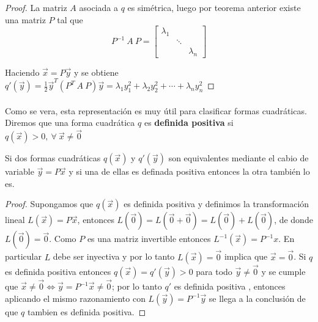 \begin{proof}
La matriz $A$ asociada a $q$ es simétrica, luego por teorema anterior existe una matriz $P$ tal que 
\begin{equation*}
    P^{-1}~A~P = \begin{bmatrix}
    \lambda_{1} & &\\
    & \ddots & \\
    & & \lambda_{n}
    \end{bmatrix}
    \label{ecuacion:1.4}
\end{equation*}

Haciendo $\overrightarrow{x} = P\overrightarrow{y}$ y se obtiene $q'(\overrightarrow{y}) = \frac{1}{2}\overrightarrow{y}^{T}\left(P^{T}~A~P\right)\overrightarrow{y} = \lambda_{1}y_{1}^{2} + \lambda_{2}y_{2}^{2} + \cdots + \lambda_{n}y_{n}^{2}$

\end{proof}

\paragraph*{}
Como se vera, esta representación es muy útil para clasificar formas cuadráticas. Diremos que una forma cuadrática $q$ es \textbf{definida positiva} si $q(\overrightarrow{x}) > 0, ~\forall~ \overrightarrow{x} \neq \overrightarrow{0}$ 

\begin{lemma}
Si dos formas cuadráticas $q(\overrightarrow{x})$ y $q'(\overrightarrow{y})$ son equivalentes mediante el cabio de variable $\overrightarrow{y} = P\overrightarrow{x}$ y si una de ellas es definada positiva entonces la otra también lo es.
\label{lema:1.3}
\end{lemma}

\begin{proof}
Supongamos que $q(\overrightarrow{x})$ es definida positiva y definimos la transformación lineal $L(\overrightarrow{x}) = P\overrightarrow{x}$, entonces $L(\overrightarrow{0}) = L(\overrightarrow{0}+ \overrightarrow{0}) = L(\overrightarrow{0}) + L(\overrightarrow{0})$, de donde $L(\overrightarrow{0}) = \overrightarrow{0}$. Como $P$ es una matriz invertible entonces $L^{-1}(\overrightarrow{x}) = P^{-1}x$. En particular $L$ debe ser inyectiva y por lo tanto $L(\overrightarrow{x})=\overrightarrow{0}$ implica que $\overrightarrow{x}=\overrightarrow{0}$. Si $q$ es definida positiva entonces $q(\overrightarrow{x}) = q'(\overrightarrow{y}) > 0$ para todo $\overrightarrow{y} \neq \overrightarrow{0}$ y se cumple que $\overrightarrow{x} \neq \overrightarrow{0} \Leftrightarrow \overrightarrow{y} = P^{-1}\overrightarrow{x} \neq \overrightarrow{0}$; por lo tanto $q'$ es definida positiva , entonces aplicando el mismo razonamiento con $L(\overrightarrow{y}) = P^{-1}\overrightarrow{y}$ se llega a la conclusión de que $q$ tambien es definida positiva. 
\end{proof}

